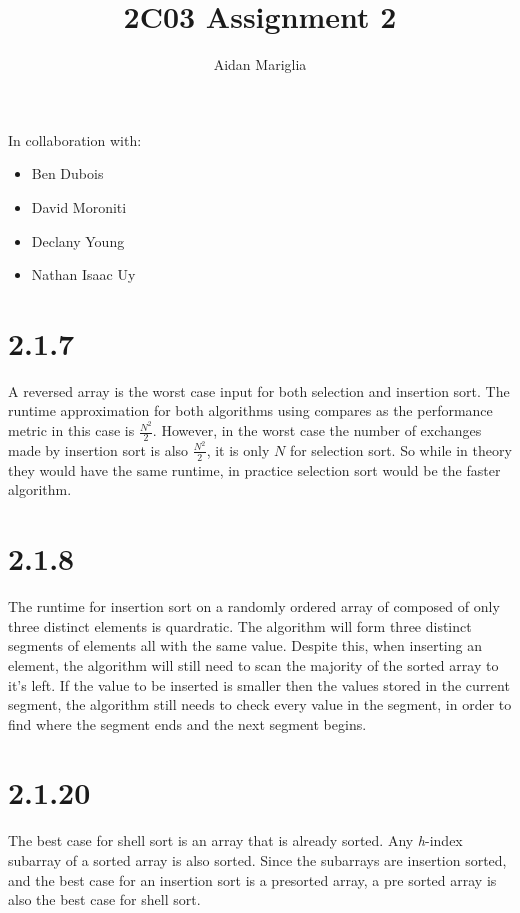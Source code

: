 \documentclass[12pt]{article}
\title{2C03 Assignment 2}
\author{Aidan Mariglia}
\begin{document}
\maketitle

In collaboration with:
\begin{itemize}[noitemsep]
    \item Ben Dubois
    \item David Moroniti
    \item Declany Young
    \item Nathan Isaac Uy
\end{itemize}

\section*{2.1.7}

A reversed array is the worst case input for both selection and insertion sort.
The runtime approximation for both algorithms using compares as the performance
metric in this case is $\frac{N^2}{2}$. However, in the worst case the number of
exchanges made by insertion sort is also $\frac{N^2}{2}$, it is only $N$ for
selection sort. So while in theory they would have the same runtime, in 
practice selection sort would be the faster algorithm.

\section*{2.1.8}

The runtime for insertion sort on a randomly ordered array of composed
of only three distinct elements is quardratic. The algorithm will form three
distinct segments of elements all with the same value. Despite this, when
inserting an element, the algorithm will still need to scan the majority of
the sorted array to it's left. If the value to be inserted is smaller then
the values stored in the current segment, the algorithm still needs to check
every value in the segment, in order to find where the segment ends and the
next segment begins.

\section*{2.1.20}

The best case for shell sort is an array that is already sorted. Any
\emph{h}-index subarray of a sorted array is also sorted. Since the 
subarrays are insertion sorted, and the best case for an insertion sort
is a presorted array, a pre sorted array is also the best case for shell sort.
\end{document}
